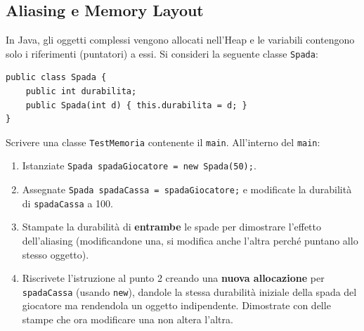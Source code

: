 \documentclass{article}
\begin{document}
\subsection{Aliasing e Memory Layout}
In Java, gli oggetti complessi vengono allocati nell'Heap e le variabili contengono solo i riferimenti (puntatori) a essi. Si consideri la seguente classe \texttt{Spada}:
\begin{verbatim}
public class Spada {
    public int durabilita;
    public Spada(int d) { this.durabilita = d; }
}
\end{verbatim}
Scrivere una classe \texttt{TestMemoria} contenente il \texttt{main}. All'interno del \texttt{main}:
\begin{enumerate}
    \item Istanziate \texttt{Spada spadaGiocatore = new Spada(50);}.
    \item Assegnate \texttt{Spada spadaCassa = spadaGiocatore;} e modificate la durabilità di \texttt{spadaCassa} a 100.
    \item Stampate la durabilità di \textbf{entrambe} le spade per dimostrare l'effetto dell'aliasing (modificandone una, si modifica anche l'altra perché puntano allo stesso oggetto).
    \item Riscrivete l'istruzione al punto 2 creando una \textbf{nuova allocazione} per \texttt{spadaCassa} (usando \texttt{new}), dandole la stessa durabilità iniziale della spada del giocatore ma rendendola un oggetto indipendente. Dimostrate con delle stampe che ora modificare una non altera l'altra.
\end{enumerate}
\end{document}
